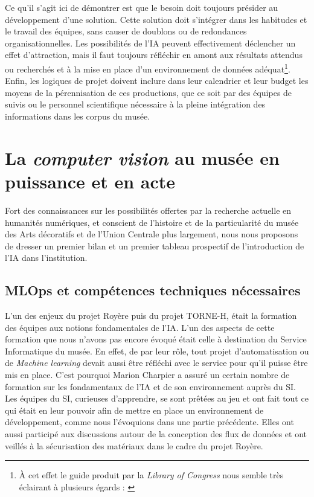Ce qu'il s'agit ici de démontrer est que le besoin doit toujours présider au développement d'une solution. Cette solution doit s'intégrer dans les habitudes et le travail des équipes, sans causer de doublons ou de redondances organisationnelles. Les possibilités de l'IA peuvent effectivement déclencher un effet d'attraction, mais il faut toujours réfléchir en amont aux résultats attendus ou recherchés et à la mise en place d'un environnement de données adéquat\footnote{À cet effet le guide produit par la \textit{Library of Congress} nous semble très éclairant à plusieurs égards : \cite{manchester_introducing_2023}}. Enfin, les logiques de projet doivent inclure dans leur calendrier et leur budget les moyens de la pérennisation de ces productions, que ce soit par des équipes de suivis ou le personnel scientifique nécessaire à la pleine intégration des informations dans les corpus du musée.


\chapter{La \textit{computer vision} au musée en puissance et en acte}	

Fort des connaissances sur les possibilités offertes par la recherche actuelle en humanités numériques, et conscient de l'histoire et de la particularité du musée des Arts décoratifs et de l'Union Centrale plus largement, nous nous proposons de dresser un premier bilan et un premier tableau prospectif de l'introduction de l'IA dans l'institution.

\section{MLOps et compétences techniques nécessaires}

L'un des enjeux du projet Royère puis du projet TORNE-H, était la formation des équipes aux notions fondamentales de l'IA. L'un des aspects de cette formation que nous n'avons pas encore évoqué était celle à destination du Service Informatique du musée. En effet, de par leur rôle, tout projet d'automatisation ou de \textit{Machine learning} devait aussi être réfléchi avec le service pour qu'il puisse être mis en place. C’est pourquoi Marion Charpier a assuré un certain nombre de formation sur les fondamentaux de l'IA et de son environnement auprès du SI. Les équipes du SI, curieuses d'apprendre, se sont prêtées au jeu et ont fait tout ce qui était en leur pouvoir afin de mettre en place un environnement de développement, comme nous l'évoquions dans une partie précédente. Elles ont aussi participé aux discussions autour de la conception des flux de données et ont veillés à la sécurisation des matériaux dans le cadre du projet Royère. 

